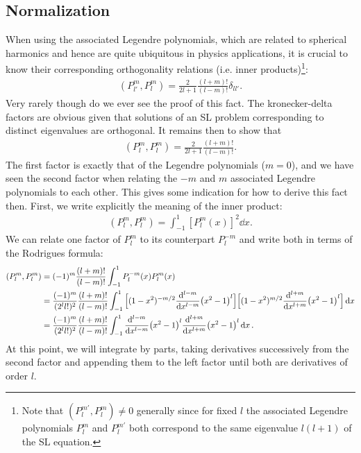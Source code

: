 \subsection{Normalization}

When using the associated Legendre polynomials, which are related to spherical harmonics and hence are quite ubiquitous in physics applications, it is crucial to know their corresponding orthogonality relations (i.e. inner products)\footnote{Note that $(P_{l}^{m'},P_{l}^{m}) \ne 0$ generally since for fixed $l$ the associated Legendre polynomials $P_{l}^{m}$ and $P_{l}^{m'}$ both correspond to the same eigenvalue $l(l+1)$ of the SL equation.}:
\begin{eqnarray}
    (P_{l'}^{m},P_{l}^{m}) = \frac{2}{2l+1} \frac{(l+m)!}{(l-m)!} \delta_{ll'}
.\end{eqnarray}
Very rarely though do we ever see the proof of this fact.
The kronecker-delta factors are obvious given that solutions of an SL problem corresponding to distinct eigenvalues are orthogonal.
It remains then to show that
\begin{eqnarray}
    (P_{l}^{m},P_{l}^{m}) = \frac{2}{2l+1} \frac{(l+m)!}{(l-m)!}
.\end{eqnarray}
The first factor is exactly that of the Legendre polynomials ($m = 0$), and we have seen the second factor when relating the $-m$ and $m$ associated Legendre polynomials to each other.
This gives some indication for how to derive this fact then.
First, we write explicitly the meaning of the inner product:
\begin{eqnarray}
    (P_{l}^{m},P_{l}^{m}) = \int_{-1}^{1} [P_{l}^{m}(x)]^2 \dd{x}
.\end{eqnarray}
We can relate one factor of $P_{l}^{m}$ to its counterpart $P_{l}^{-m}$ and write both in terms of the Rodrigues formula:
\begin{align}
    (P_{l}^{m},P_{l}^{m}) &= (-1)^{m}\frac{(l+m)!}{(l-m)!} \int_{-1}^{1} P_{l}^{-m}(x) P_{l}^{m}(x) \nonumber \\
                          &= \frac{(-1)^{m}}{(2^{l} l!)^2} \frac{(l+m)!}{(l-m)!} \int_{-1}^{1} \Big[ (1-x^2)^{-m/2} \dv[l-m]{x} (x^2 - 1)^{l} \Big] \Big[ (1 - x^2)^{m/2} \dv[l+m]{x} (x^2 - 1)^{l} \Big] \dd{x} \nonumber \\
                          &= \frac{(-1)^{m}}{(2^{l} l!)^{2}} \frac{(l+m)!}{(l-m)!} \int_{-1}^{1} \dv[l-m]{x} (x^2 - 1)^{l} \dv[l+m]{x} (x^2 - 1)^{l} \dd{x}
.\end{align}
At this point, we will integrate by parts, taking derivatives successively from the second factor and appending them to the left factor until both are derivatives of order $l$.
